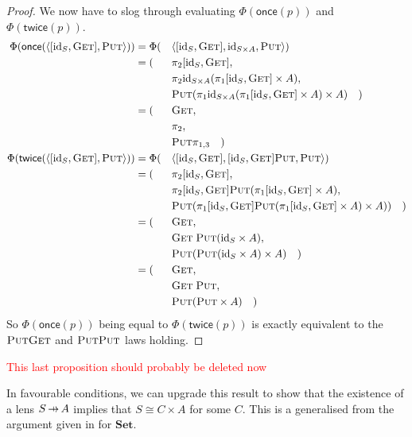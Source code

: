 \documentclass[11pt,a4paper]{article}
\theoremstyle{plain}
\theoremstyle{definition}
\newcommand{\Set}{\mathbf{Set}}
\newcommand{\id}{\mathrm{id}}
\newcommand{\fget}{\textsc{Get}}
\newcommand{\fput}{\textsc{Put}}
\newcommand{\once}{\mathsf{once}}
\newcommand{\twice}{\mathsf{twice}}
\newcommand{\hto}{\ensuremath{\,\mathaccent\shortmid\rightarrow\,}}
\newcommand{\todo}[1]{\textcolor{red}{\small #1}}
\begin{document}
\begin{proof}
We now have to slog through evaluating $\Phi(\once(p))$ and $\Phi(\twice(p))$.
\begin{alignat*}{3}
\Phi(\once(\langle [\id_S, \fget],  \fput \rangle)) &= 
\Phi(&&\langle [\id_S, \fget], \id_{S \times A}, \fput \rangle) \\
&= (&&\pi_2 [\id_S, \fget], \\
&&&\pi_2 \id_{S \times A} (\pi_1 [\id_S, \fget] \times A), \\
&&& \fput (\pi_1 \id_{S \times A} (\pi_1 [\id_S, \fget] \times A) \times A) \quad) \\
%
&= (&&\fget, \\
&&& \pi_2, \\
&&& \fput \pi_{1,3} \quad) \\
\Phi(\twice(\langle [\id_S, \fget],  \fput \rangle)) &= 
\Phi(&&\langle [\id_S, \fget], [\id_S, \fget]\fput, \fput \rangle) \\
&= (&&\pi_2 [\id_S, \fget], \\
&&&\pi_2 [\id_S, \fget]\fput (\pi_1 [\id_S, \fget] \times A), \\
&&& \fput (\pi_1 [\id_S, \fget]\fput (\pi_1 [\id_S, \fget] \times A) \times A)) \quad) \\
%
&= (&&\fget, \\
&&& \fget \; \fput (\id_S \times A), \\
&&& \fput (\fput (\id_S \times A) \times A) \quad) \\
%
&= (&&\fget, \\
&&& \fget \; \fput, \\
&&& \fput (\fput \times A) \quad)
\end{alignat*}
So $\Phi(\once(p))$ being equal to $\Phi(\twice(p))$ is exactly equivalent to the $\fput\fget$ and $\fput\fput$ laws holding.
\end{proof}

\todo{This last proposition should probably be deleted now}

In favourable conditions, we can upgrade this result to show that the existence of a lens $S \hto A$ implies that $S \cong C \times A$ for some $C$. This is a generalised from the argument given in \cite[Corollary 13]{AlgebrasAndUpdateStrategies} for $\Set$.
\end{document}
